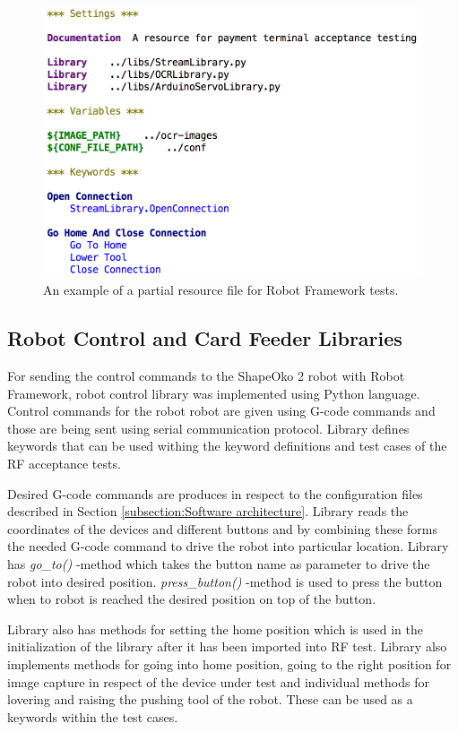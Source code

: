 \begin{figure}[ht]
  \begin{center}
    \includegraphics[width=12cm]{images/resource.png}
    \caption{An example of a partial resource file for Robot Framework tests.}
    \label{fig:resource}
  \end{center}
\end{figure}
\FloatBarrier

\subsection{Robot Control and Card Feeder Libraries}
\label{subsection:libraries}

For sending the control commands to the ShapeOko 2 robot with Robot Framework, robot control library was implemented using Python language. Control commands for the robot robot are given using G-code commands and those are being sent using serial communication protocol. Library defines keywords that can be used withing the keyword definitions and test cases of the RF acceptance tests.

Desired G-code commands are produces in respect to the configuration files described in Section \ref{subsection:Software architecture}. Library reads the coordinates of the devices and different buttons and by combining these forms the needed G-code command to drive the robot into particular location. Library has \emph{go\_to()} -method which takes the button name as parameter to drive the robot into desired position. \emph{press\_button()} -method is used to press the button when to robot is reached the desired position on top of the button.

Library also has methods for setting the home position which is used in the initialization of the library after it has been imported into RF test. Library also implements methods for going into home position, going to the right position for image capture in respect of the device under test and individual methods for lovering and raising the pushing tool of the robot. These can be used as a keywords within the test cases.

